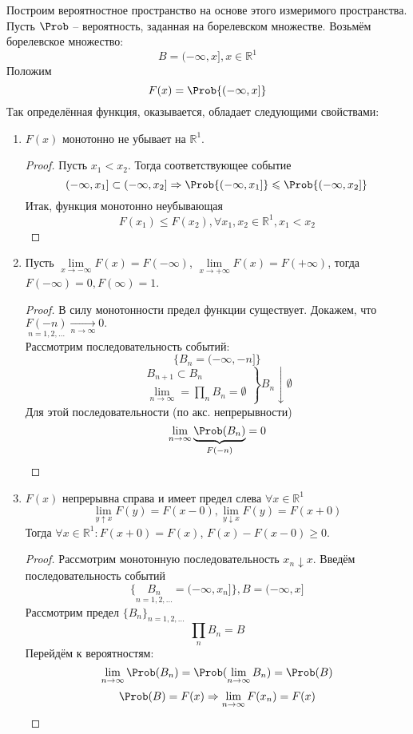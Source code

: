 Построим вероятностное пространство на основе этого измеримого пространства. Пусть $\Prob$ -- вероятность, заданная на борелевском множестве. Возьмём борелевское множество:
\[
	B = (- \infty, x], x \in \mathbb{R}^1
\]
Положим
\begin{equation}\label{2-3-1}
	F (x) = \Prob \{ (- \infty, x] \}
\end{equation}
Так определённая функция, оказывается, обладает следующими свойствами:
\begin{enumerate}
	\item $F(x)$ монотонно не убывает на $\mathbb{R}^1$.
	      \begin{proof}
		      Пусть $x_1 < x_2$. Тогда соответствующее событие
		      \[
			      (-\infty, x_1] \subset (-\infty, x_2] \Rightarrow \Prob \{ (-\infty, x_1] \} \leqslant \Prob \{ (-\infty, x_2] \}
		      \]
		      Итак, функция монотонно неубывающая
		      \[
			      F(x_1) \leqslant F(x_2), \forall x_1, x_2 \in \mathbb{R}^1, x_1 < x_2
		      \]
	      \end{proof}
	\item Пусть $\lim\limits_{x \to -\infty} F(x) = F(-\infty)$, $\lim\limits_{x \to +\infty} F(x) = F(+\infty)$, тогда $F(-\infty) = 0, F(\infty) = 1$.
	      \begin{proof}
		      В силу монотонности предел функции существует. Докажем, что $\underset{n = 1, 2, \ldots}{F(-n)} \underset{n \to \infty}{\rightarrow} 0.$ \\
		      Рассмотрим последовательность событий:
		      \[
			      \{ B_n = (-\infty, -n] \}
		      \]
		      \[
			      \left.
			      \begin{split}
				      B_{n+1} \subset B_n \\
				      \lim\limits_{n \to \infty} = \prod\limits_n B_n = \emptyset
			      \end{split}
			      \right\}
			      B_n \downarrow \emptyset
		      \]
		      Для этой последовательности (по акс. непрерывности)
		      \[
			      \lim\limits_{n \to \infty} \underbrace{\Prob(B_n)}_{F(-n)} = 0
		      \]
	      \end{proof}
	\item $F(x)$ непрерывна справа и имеет предел слева $\forall x \in \mathbb{R}^1$
	      \[
		      \lim\limits_{y \uparrow x} F(y) = F(x - 0), \lim\limits_{y \downarrow x} F(y) = F(x + 0)
	      \]
	      Тогда $\forall x \in \mathbb{R}^1: F(x+0) = F(x)$, $F(x) - F(x-0) \geqslant 0$.
	      \begin{proof}
		      Рассмотрим монотонную последовательность $x_n \downarrow x$. Введём последовательность событий
		      \[
			      \{ \underset{n = 1, 2, \ldots}{B_n} = (-\infty, x_n] \}, B = (-\infty, x]
		      \]
		      Рассмотрим предел $\{ B_n \}_{n = 1, 2, \ldots}$
		      \[
			      \prod\limits_n B_n = B
		      \]
		      Перейдём к вероятностям:
		      \[
			      \lim\limits_{n \to \infty} \Prob(B_n) = \Prob(\lim\limits_{n \to \infty} B_n) = \Prob(B)
		      \]
		      \[
			      \Prob(B) = F(x) \Rightarrow \lim\limits_{n \to \infty} F(x_n) = F(x)
		      \]
	      \end{proof}
\end{enumerate}
